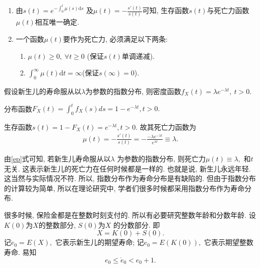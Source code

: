 \documentclass[lang=cn,10pt]{elegantbook}
\begin{document}
\begin{remark}
    \begin{enumerate}
        \item 由$s(t) = e^{-\int_{0}^{t}\mu(s)\mathrm{d}s}$ 及$ \mu(t) = -\frac{s'(t)}{s(t)}$可知, 生存函数$s(t)$与死亡力函数$\mu(t)$相互唯一确定.
        \item 一个函数$\mu(t)$要作为死亡力, 必须满足以下两条:
            \begin{enumerate}
                \item $\mu(t) \geq 0, ~\forall t \geq 0$ (保证$s(t)$单调递减).
                \item $\int_0^{\infty}\mu(t)\mathrm{d}t = \infty$(保证$s(\infty)=0$).
            \end{enumerate}
    \end{enumerate}
\end{remark}

\begin{example}
    假设新生儿的寿命服从以$\lambda$为参数的指数分布, 则密度函数$f_X(t)=\lambda e^{-\lambda t},~t>0.$
\end{example}
\begin{solution}
	分布函数$F_X(t)=\int_0^t f_X(s)ds=1-e^{-\lambda t}, t>0.$ 
	
	生存函数$s(t)=1-F_X(t)=e^{-\lambda t},t>0.$  故其死亡力函数为
    \begin{align}\label{ep}
        \mu(t)=-\frac{s'(t)}{s(t)}=-\frac{-\lambda e^{-\lambda t}}{e^{\lambda t}}\equiv\lambda.
    \end{align}
\end{solution}

\begin{remark}
    由\eqref{ep}式可知, 若新生儿寿命服从以$\lambda$ 为参数的指数分布, 则死亡力$\mu(t)\equiv \lambda,$ 和$t$ 无关. 这表示新生儿的死亡力在任何时候都是一样的. 也就是说, 新生儿永远年轻. 这当然与实际情况不符. 所以, 指数分布作为寿命分布是有缺陷的. 但由于指数分布的计算较为简单, 所以在理论研究中, 学者们很多时候都采用指数分布作为寿命分布.
\end{remark}

\begin{definition}[整数年龄与分数年龄]
	很多时候, 保险金都是在整数时刻支付的. 所以有必要研究整数年龄和分数年龄. 设$K(0)$为$X$的整数部分, $S(0)$为$X$ 的分数部分. 即
$$X = K(0) + S(0).$$
记$\mathring{e}_0 = E(X),$ 它表示新生儿的期望寿命; 记$e_0 = E(K(0)),$ 它表示期望整数寿命. 易知
\begin{equation*}
    e_0 \le \mathring{e}_0 < e_0 + 1.
\end{equation*}
\end{definition}
\end{document}

